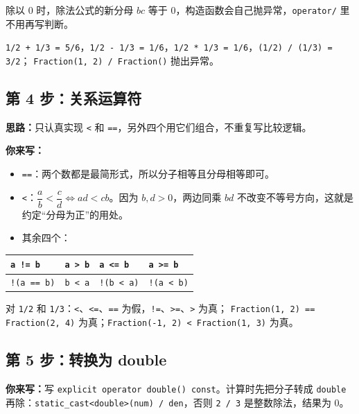 \documentclass[11pt,a4paper]{article}
\newcommand{\code}[1]{\texttt{#1}}
\newcommand{\idea}{\textbf{思路：}}
\newcommand{\todo}{\textbf{你来写：}}
\begin{document}
除以 0 时，除法公式的新分母 $bc$ 等于 0，构造函数会自己抛异常，\code{operator/} 里不用再写判断。

\begin{done}
\code{1/2 + 1/3 = 5/6}，\code{1/2 - 1/3 = 1/6}，\code{1/2 * 1/3 = 1/6}，\code{(1/2) / (1/3) = 3/2}；
\code{Fraction(1, 2) / Fraction()} 抛出异常。
\end{done}

\subsection{第 4 步：关系运算符}

\idea 只认真实现 \code{<} 和 \code{==}，另外四个用它们组合，不重复写比较逻辑。

\todo
\begin{itemize}
  \item \code{==}：两个数都是最简形式，所以分子相等且分母相等即可。
  \item \code{<}：$\dfrac{a}{b} < \dfrac{c}{d} \iff ad < cb$。因为 $b, d > 0$，两边同乘 $bd$ 不改变不等号方向，这就是约定“分母为正”的用处。
  \item 其余四个：
\end{itemize}

\begin{center}
\small
\begin{tabular}{@{}llll@{}}
\toprule
\code{a != b} & \code{a > b} & \code{a <= b} & \code{a >= b} \\
\midrule
\code{!(a == b)} & \code{b < a} & \code{!(b < a)} & \code{!(a < b)} \\
\bottomrule
\end{tabular}
\end{center}

\begin{done}
对 \code{1/2} 和 \code{1/3}：\code{<}、\code{<=}、\code{==} 为假，\code{!=}、\code{>=}、\code{>} 为真；
\code{Fraction(1, 2) == Fraction(2, 4)} 为真；\code{Fraction(-1, 2) < Fraction(1, 3)} 为真。
\end{done}

\subsection{第 5 步：转换为 double}

\todo 写 \code{explicit operator double() const}。计算时先把分子转成 \code{double} 再除：\code{static\_cast<double>(num) / den}，否则 \code{2 / 3} 是整数除法，结果为 0。
\end{document}
